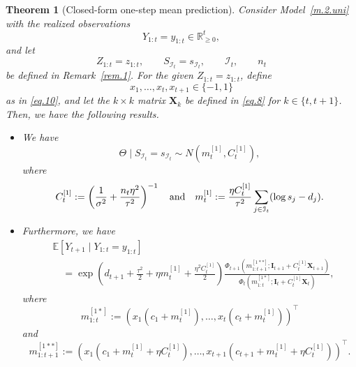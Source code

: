 \documentclass[11pt,authoryear]{elsarticle}
\def\Real{\mathbb{R}}
\def\E#1{{\mathbb E}\left[#1\right]}
\newtheorem{theorem}{Theorem}
\theoremstyle{nopunct}
\numberwithin{equation}{section}
\begin{document}
\begin{theorem}[Closed-form one-step mean prediction]
\label{thm.2.uni}
Consider Model~\ref{m.2.uni} with the realized observations
\[
Y_{1:t}=y_{1:t}\in\Real_{\ge 0}^t,
\]
and let
\[
Z_{1:t}=z_{1:t},
\qquad
S_{\mathcal I_t}=s_{\mathcal I_t},
\qquad
\mathcal I_t,
\qquad
n_t
\]
be defined in Remark~\ref{rem.1}.
For the given \(Z_{1:t}=z_{1:t}\), define
\[
x_1,\ldots,x_t,x_{t+1}\in\{-1,1\}
\]
as in \eqref{eq.10}, and let the \(k\times k\) matrix
\(\boldsymbol X_k\) be defined in \eqref{eq.8} for
\(k\in\{t,t+1\}\).
Then, we have the following results.

\begin{itemize}
\item[i.] We have
\begin{equation}\label{eq.posterior.shared}
\Theta
\mid
S_{\mathcal I_t}=s_{\mathcal I_t}
\sim
N(m_t^{[1]},C_t^{[1]}),
\end{equation}
where
\begin{equation}\label{eq.222}
C_t^{[1]}
:=
\left(
\frac{1}{\sigma^2}
+
\frac{n_t\eta^2}{\tau^2}
\right)^{-1}
\quad\hbox{and}\quad
m_t^{[1]}
:=
\frac{\eta C_t^{[1]}}{\tau^2}
\sum_{j\in\mathcal I_t}
(\log s_j-d_j).
\end{equation}


\item[ii.] Furthermore, we have
\[
\begin{aligned}
&\E{
Y_{t+1}
\mid
Y_{1:t}=y_{1:t}
}\\
&\quad=
\exp\left(
d_{t+1}
+
\frac{\tau^2}{2}
+
\eta m_t^{[1]}
+
\frac{\eta^2C_t^{[1]}}{2}
\right)
\frac{
\Phi_{t+1}
\left(
m_{1:t+1}^{[1**]};
\boldsymbol I_{t+1}
+
C_t^{[1]}\boldsymbol X_{t+1}
\right)
}{
\Phi_t
\left(
m_{1:t}^{[1*]};
\boldsymbol I_t
+
C_t^{[1]}\boldsymbol X_t
\right)
},
\end{aligned}
\]
where
\[
m_{1:t}^{[1*]}
:=
\left(
x_1(c_1+m_t^{[1]}),
\ldots,
x_t(c_t+m_t^{[1]})
\right)^\top
\]
and
\[
m_{1:t+1}^{[1**]}
:=
\left(
x_1(c_1+m_t^{[1]}+\eta C_t^{[1]}),
\ldots,
x_{t+1}(c_{t+1}+m_t^{[1]}+\eta C_t^{[1]})
\right)^\top.
\]
\end{itemize}
\end{theorem}
\end{document}
